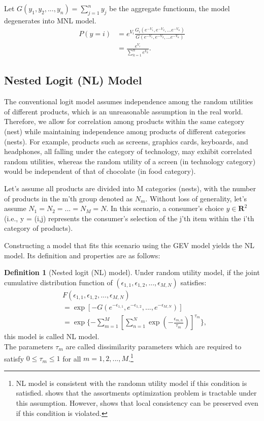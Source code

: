 \documentclass[12pt]{article}
\theoremstyle{definition}
\newtheorem{definition}{Definition}[section]
\begin{document}
\begin{sloppypar}
Let $G(y_1, y_2, ..., y_n)=\sum_{j=1}^{n} y_j$ be the aggregate functionm, the model degenerates into MNL model.
\begin{align*}
    P(y=i) &= e^{V_{i}}\frac{G_i(e^{-V_1},e^{-V_2},...e^{-V_n})}{G(e^{-V_1},e^{-V_2},...e^{-V_n})}\\
    &= \frac{e^{V_{i}}}{\sum_{k=1}^{n} e^{V_{k}}}.
\end{align*}
\subsection{Nested Logit (NL) Model}
The conventional logit model assumes independence among the random utilities of different products, which is an unreasonable assumption in the real world. Therefore, we allow for correlation among products within the same category (nest) while maintaining independence among products of different categories (nests). For example, products such as screens, graphics cards, keyboards, and headphones, all falling under the category of technology, may exhibit correlated random utilities, whereas the random utility of a screen (in technology category) would be independent of that of chocolate (in food category).

Let's assume all products are divided into M categories (nests), with the number of products in the m'th group denoted as $N_m$. Without loss of generality, let's assume $N_1 = N_2 = ... = N_M = N$. In this scenario, a consumer's choice $y \in \textbf{R}^2$ (i.e., y = (i,j) represents the consumer's selection of the j'th item within the i'th category of products).

Constructing a model that fits this scenario using the GEV model yields the NL model. Its definition and properties are as follows:
\begin{definition}[Nested logit (NL) model]
    Under random utility model, if the joint cumulative distribution function of $(\epsilon_{1,1}, \epsilon_{1,2}, ..., \epsilon_{M,N})$ satisfies:
    \begin{align*}
        &F(\epsilon_{1,1}, \epsilon_{1,2}, ..., \epsilon_{M,N})\\
        &=\exp[-G(e^{-\epsilon_{1,1}}, e^{-\epsilon_{1,2}}, ..., e^{-\epsilon_{M,N}})]\\
        &=\exp\{-\sum_{m=1}^{M}[\sum_{n=1}^{N}\exp(-\frac{\epsilon_{m,n}}{\tau_m})]^{\tau_m}\},
    \end{align*}
    this model is called NL model. \\
    The parameters $\tau_m$ are called dissimilarity parameters which are required to satisfy $0 \leq \tau_m \leq 1$ for all $m=1,2,...,M$.\footnote{NL model is consistent with the randomn utility model if this condition is satisfied. \textcite{davis2014} shows that the assortments optimization problem is tractable under this assumption. However, \textcite{borsch1990} shows that local consistency can be preserved even if this condition is violated. }
\end{definition}


\end{sloppypar}
\end{document}

